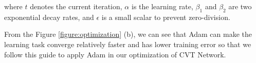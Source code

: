 \begin{algorithm}[H]	
\end{algorithm}

where $ t $ denotes the current iteration, $\alpha$ is the learning rate, $\beta_1$ and $\beta_2$ are two exponential decay rates, and $\epsilon$ is a small scalar to prevent zero-division.

From the Figure \ref{figure:optimization} (b), we can see that Adam can make the learning task converge relatively faster and has lower training error so that we follow this guide to apply Adam in our optimization of CVT Network.
